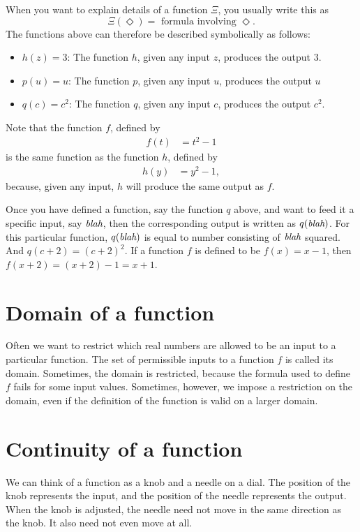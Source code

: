 \documentclass{math-deane}
\begin{document}
When you want to explain details of a function $\Xi$, you usually write this as
\[ \Xi(\Diamond) = \text{ formula involving }\Diamond. \]
The functions above can therefore be described symbolically as follows:

\begin{itemize}
\item $h(z) = 3$: The function $h$, given any input $z$, produces the output $3$.
\item $p(u) = u$: The function $p$, given any input $u$, produces the output $u$
\item $q(c) = c^2$: The function $q$, given any input $c$, produces the output $c^2$.
\end{itemize}

Note that the function $f$, defined by
\begin{align*}
f(t) &= t^2 - 1
\end{align*}
is the same function as the function $h$, defined by
\begin{align*}
h(y) &= y^2-1,
\end{align*}
because, given any input, $h$ will produce the same output as $f$.

Once you have defined a function, say the function $q$ above, and want to feed it a specific input, say $\text{\em blah}$, then the corresponding output is written as $q(\text{\em blah})$. For this particular function, $q(\text{\em blah})$ is equal to number consisting of $\text{\em blah}$ squared. And $q(c+2) = (c+2)^2$. If a function $f$ is defined to be $f(x) = x - 1$, then $f(x+2) = (x+2) - 1 = x + 1$.

\section{Domain of a function}

Often we want to restrict which real numbers are allowed to be an input to a particular function. The set of permissible inputs to a function $f$ is called its domain. Sometimes, the domain is restricted, because the formula used to define $f$ fails for some input values. Sometimes, however, we impose a restriction on the domain, even if the definition of the function is valid on a larger domain.

\section{Continuity of a function}

We can think of a function as a knob and a needle on a dial. The position of the knob represents the input, and the position of the needle represents the output. When the knob is adjusted, the needle need not move in the same direction as the knob. It also need not even move at all.
\end{document}
